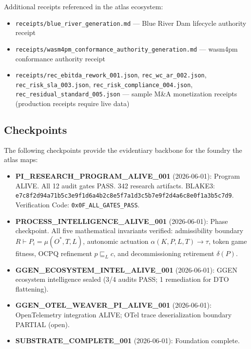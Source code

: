 Additional receipts referenced in the atlas ecosystem:

\begin{itemize}
  \item \texttt{receipts/blue\_river\_generation.md} --- Blue River Dam lifecycle
        authority receipt
  \item \texttt{receipts/wasm4pm\_conformance\_authority\_generation.md} ---
        wasm4pm conformance authority receipt
  \item \texttt{receipts/rec\_ebitda\_rework\_001.json},
        \texttt{rec\_wc\_ar\_002.json}, \texttt{rec\_risk\_sla\_003.json},
        \texttt{rec\_risk\_compliance\_004.json},
        \texttt{rec\_residual\_standard\_005.json} --- sample M\&A monetization
        receipts (production receipts require live data)
\end{itemize}

\subsection{Checkpoints}
\label{sec:atlas-evidence-checkpoints}

The following checkpoints provide the evidentiary backbone for the foundry the
atlas maps:

\begin{itemize}
  \item \textbf{PI\_RESEARCH\_PROGRAM\_ALIVE\_001} (2026-06-01): Program ALIVE.
        All 12 audit gates PASS. 342 research artifacts. BLAKE3:
        \texttt{e7c8f2d94a71b5c3e9f1d6a4b2c8e5f7a1d3c5b7e9f2d4a6c8e0f1a3b5c7d9}.
        Verification Code: \texttt{0x0F\_ALL\_GATES\_PASS}.

  \item \textbf{PROCESS\_INTELLIGENCE\_ALIVE\_001} (2026-06-01): Phase checkpoint.
        All five mathematical invariants verified: admissibility boundary
        $R \vdash P_i = \mu(O^*, T, L)$, autonomic actuation
        $\alpha(K, P, L, T) \to \tau$, token game fitness, OCPQ refinement
        $p \sqsubseteq_L c$, and decommissioning retirement $\delta(P)$.

  \item \textbf{GGEN\_ECOSYSTEM\_INTEL\_ALIVE\_001} (2026-06-01): GGEN ecosystem
        intelligence sealed (3/4 audits PASS; 1 remediation for DTO flattening).

  \item \textbf{GGEN\_OTEL\_WEAVER\_PI\_ALIVE\_001} (2026-06-01): OpenTelemetry
        integration ALIVE; OTel trace deserialization boundary PARTIAL (open).

  \item \textbf{SUBSTRATE\_COMPLETE\_001} (2026-06-01): Foundation complete.
\end{itemize}

